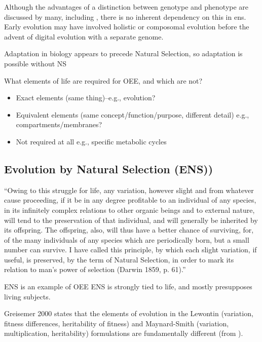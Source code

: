 Although the advantages of a distinction between genotype and phenotype are discussed by many, including \autocite[section 7.2.3]{Taylor1999}, there is no inherent dependency on this in \gls{ens}. Early evolution may have involved holistic or composomal evolution before the advent of digital evolution with a separate genome.

Adaptation in biology appears to precede Natural Selection, so adaptation is possible without NS \autocite{Watson2010}	      	      	

What elements of life are required for OEE, and which are not?

\begin{itemize}
	\item
	      Exact elements (same thing)--e.g., evolution?
	\item
	      Equivalent elements (same concept/function/purpose, different detail) e.g., compartments/membranes?
	\item
	      Not required at all e.g., specific metabolic cycles
\end{itemize}
\subsection{Evolution by Natural Selection (ENS))}\label{ens-evolution-by-natural-selection}


		``Owing to this struggle for life, any variation, however slight and
		from whatever cause proceeding, if it be in any degree profitable to
		an individual of any species, in its infinitely complex relations to
		other organic beings and to external nature, will tend to the
		preservation of that individual, and will generally be inherited by
		its offspring. The offspring, also, will thus have a better chance
		of surviving, for, of the many individuals of any species which are
		periodically born, but a small number can survive. I have called
		this principle, by which each slight variation, if useful, is
		preserved, by the term of Natural Selection, in order to mark its
		relation to man's power of selection (Darwin 1859, p. 61).'' \autocite{Griesemer2005}
		
ENS is an example of OEE
ENS is strongly tied to life, and mostly presupposes living subjects.

	Greisemer 2000 states that the elements of evolution in the Lewontin (variation, fitness differences, heritability of fitness) and Maynard-Smith (variation, multiplication, heritability) formulations are fundamentally different (from \autocite{Vasas2015}).



